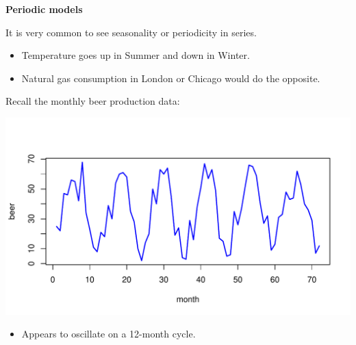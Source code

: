 \documentclass[12pt,xcolor=svgnames]{beamer}
\newcommand{\rd}{\color{red}}
\newcommand{\theme}{\color{FireBrick}}
\newcommand{\sk}{\vspace{.4cm}}
\newcommand{\nsk}{\vspace{-.4cm}}
\newcommand{\chap}[1]{{\theme \Large \bf #1} \sk}
\begin{document}
\begin{frame}
\chap{Periodic models}

It is very common to see {\rd seasonality} or {\rd periodicity} in
series.
\begin{itemize}
\item Temperature goes up in Summer and down in Winter.  
\item Natural gas consumption in London or Chicago would do the opposite.
\end{itemize}

\sk
Recall the monthly beer production data:
\begin{minipage}{6cm}
\includegraphics[scale=0.48,trim=10 20 0 25]{beer_new}
\end{minipage} \hfill
\begin{minipage}{2.85cm}
\nsk
\begin{itemize}
\item Appears to oscillate on a 12-month cycle.
\end{itemize}
\end{minipage}
\end{frame}
\end{document}
